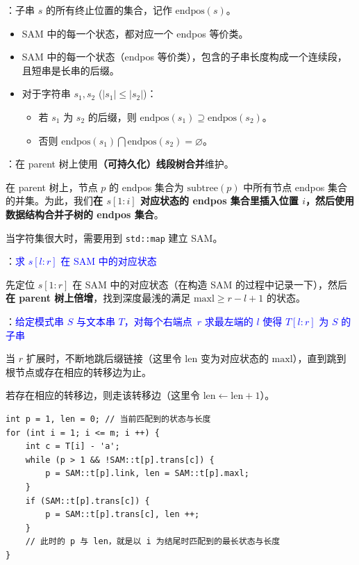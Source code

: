：子串 $s$ 的所有终止位置的集合，记作 $\mathrm{endpos}(s)$。

\begin{itemize}
    \item SAM 中的每一个状态，都对应一个 endpos 等价类。
    \item SAM 中的每一个状态（endpos 等价类），包含的子串长度构成一个连续段，且短串是长串的后缀。
    \item 对于字符串 $s_1, s_2$ ($|s_1| \leq |s_2|$)：
    \begin{itemize}
        \item 若 $s_1$ 为 $s_2$ 的后缀，则 $\mathrm{endpos}(s_1) \supseteq \mathrm{endpos}(s_2)$。
        \item 否则 $\mathrm{endpos}(s_1) \bigcap \mathrm{endpos}(s_2) = \varnothing$。
    \end{itemize}
\end{itemize}

：在 parent 树上使用\textbf{（可持久化）线段树合并}维护。

在 parent 树上，节点 $p$ 的 endpos 集合为 $\mathrm{subtree}(p)$ 中所有节点 endpos 集合的并集。为此，我们\textbf{在 $s[1 : i]$ 对应状态的 endpos 集合里插入位置 $i$，然后使用数据结构合并子树的 endpos 集合}。

当字符集很大时，需要用到 \texttt{std::map} 建立 SAM。


：\textcolor{blue}{求 $s[l : r]$ 在 SAM 中的对应状态}

先定位 $s[1 : r]$ 在 SAM 中的对应状态（在构造 SAM 的过程中记录一下），然后\textbf{在 parent 树上倍增}，找到深度最浅的满足 $\mathrm{maxl} \geq r - l + 1$ 的状态。

：\textcolor{blue}{给定模式串 $S$ 与文本串 $T$，对每个右端点~$r$ 求最左端的 $l$ 使得 $T[l : r]$ 为 $S$ 的子串}

当 $r$ 扩展时，不断地跳后缀链接（这里令 $\mathrm{len}$ 变为对应状态的 $\mathrm{maxl}$），直到跳到根节点或存在相应的转移边为止。

若存在相应的转移边，则走该转移边（这里令 $\mathrm{len} \gets \mathrm{len} + 1$）。

\begin{verbatim}
int p = 1, len = 0; // 当前匹配到的状态与长度
for (int i = 1; i <= m; i ++) {
    int c = T[i] - 'a';
    while (p > 1 && !SAM::t[p].trans[c]) {
        p = SAM::t[p].link, len = SAM::t[p].maxl;
    }
    if (SAM::t[p].trans[c]) {
        p = SAM::t[p].trans[c], len ++;
    }
    // 此时的 p 与 len，就是以 i 为结尾时匹配到的最长状态与长度
}
\end{verbatim}

